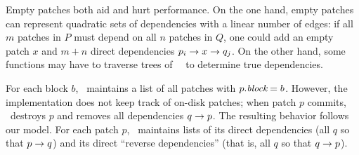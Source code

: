 Empty patches both aid and hurt performance.
%
On the one hand, empty patches can represent quadratic sets of dependencies
 with a linear number of edges: if all $m$ patches in $P$ must depend on
 all $n$ patches in $Q$, one could 
 add an empty patch $x$ and $m+n$ direct dependencies
 $p_i \rightarrow x \rightarrow q_j$.
%
On the other hand, some functions may have to traverse trees of \noop\
 \chdescs\ to determine true dependencies.


\begin{comment}
To solve this problem, we introduce an additional type of \chdesc. The
prototypical \chdesc\ corresponds to some change on disk, but \Kudos\ also
supports \aemphnoop\ \chdesc\ type, which doesn't change the disk at all.
\Noop\ \chdescs\ can have \befores, like other \chdescs, but they don't need to
be written to disk: they are trivially satisfied when all of their \befores\ are
satisfied. Thus, they can be used to ``stand for'' entire sets of other changes.
%
This capability is extremely useful, and is used by most operations on disk
structures so that a single \chdesc\ can be returned that depends on the whole
change. Likewise, \anoop\ \chdesc\ can be passed in as a parameter to a disk
operation to make the whole operation depend on a set of other changes. \Noop\
\chdescs\ allow dependencies between sets with only a linear number of
dependency edges in the \chdesc\ graph, and without having to pass around arrays
of \chdescs.
%
The cost is that some functions may have to traverse trees of \noop\ \chdescs\
to determine true dependencies.
\end{comment}


For each block $b$, \Kudos\ maintains a list of all patches with
$p.\textit{block} = b$.
%
However, the implementation does not keep track of on-disk patches; when
patch $p$ commits, \Kudos\ destroys $p$ and removes all dependencies $q
\rightarrow p$.
%
The resulting behavior follows our model.
%
For each patch $p$, \Kudos\ maintains lists of its direct dependencies (all
$q$ so that $p \rightarrow q$) and its direct ``reverse dependencies'' (that
is, all $q$ so that $q \rightarrow p$).
